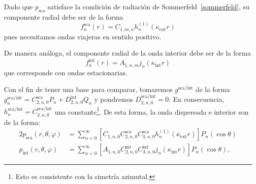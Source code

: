 \documentclass[11pt]{article}
\numberwithin{equation}{section}
\def\exterior{\textrm{ext}}
\def\interior{\textrm{int}}
\def\sca{\textrm{sca}}
\begin{document}
Dado que \(p_{\sca}\) satisface la condición de radiación de
Sommerfeld~\eqref{sommerfeld}, su componente radial debe ser de la forma
\begin{equation}
	f^{\sca}_{n}(r)
	=
	C_{1,m,n} h^{(1)}_{n}(\kappa_{\exterior} r)
\end{equation}
pues necesitamos ondas viajeras en sentido positivo.

De manera análoga, el componente radial de la onda interior debe ser de la forma
\begin{equation}
	f^{\interior}_{n}(r)
	=
	A_{1,n,m} j_{n}(\kappa_{\interior} r)
\end{equation}
que corresponde con ondas estacionarias.

Con el fin de tener una base para comparar, tomaremos \(g^{\sca/\interior}\) de
la forma \(g^{\sca/\interior}_{n} = C^{\sca}_{2,n,0} P_{n} +
D^{\interior}_{2,n,0} Q_{n}\) y pondremos \(D^{\sca/\interior}_{2,n,0} = 0\). 
En consecuencia, \(h^{\sca/\interior}_{n} = C_{3,n,0}^{\sca/\interior}\) una
constante\footnote{Esto es consistente con la simetría azimutal.}.
De esta forma, la onda dispersada e interior son de la forma:
\begin{alignat}{2}
	p_{\sca}(r,\theta,\varphi)
	&=
	\sum_{n=0}^{\infty}
	\left[
		C_{1,n,0} C^{\sca}_{2,n,0} C^{\sca}_{3,n,0} h^{(1)}_{n}(\kappa_{\exterior} r)
	\right] P_{n}(\cos\theta)
	\\
	p_{\interior}(r,\theta,\varphi)
	&=
	\sum_{n=0}^{\infty}
	\left[
		A_{1,n,0} C^{\interior}_{2,n,0} C^{\interior}_{3,n,0} j_{n}(\kappa_{\interior} r)
	\right] P_{n}(\cos\theta),
\end{alignat}
\end{document}
